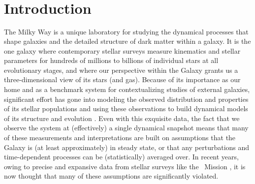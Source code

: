 \section*{~}\clearpage

\section{Introduction} \label{sec:intro}

The Milky Way is a unique laboratory for studying the dynamical processes that shape galaxies and the detailed structure of dark matter within a galaxy.
It is the one galaxy where contemporary stellar surveys measure kinematics and stellar parameters for hundreds of millions to billions of individual stars at all evolutionary stages, and where our perspective within the Galaxy grants us a three-dimensional view of its stars (and gas).
Because of its importance as our home and as a benchmark system for contextualizing studies of external galaxies, significant effort has gone into modeling the observed distribution and properties of its stellar populations \citep[for a review,][]{Bland-Hawthron:2016} and using these observations to build dynamical models of its structure and evolution \citep{TODO galactic dynamics summary}.
Even with this exquisite data, the fact that we observe the system at (effectively) a single dynamical snapshot means that many of these measurements and interpretations are built on assumptions that the Galaxy is (at least approximately) in steady state, or that any perturbations and time-dependent processes can be (statistically) averaged over.
In recent years, owing to precise and expansive data from stellar surveys like the \gaia\ Mission \citep{Gaia-overview}, it is now thought that many of these assumptions are significantly violated.



